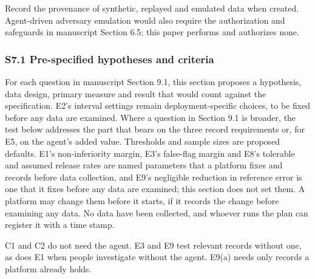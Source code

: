 \documentclass[
  11pt,
]{article}
\begin{document}
Record the provenance of synthetic, replayed and emulated data when
created. Agent-driven adversary emulation would also require the
authorization and safeguards in manuscript Section 6.5; this paper
performs and authorizes none.

\hypertarget{s7.1-pre-specified-hypotheses-and-criteria}{%
\subsubsection{S7.1 Pre-specified hypotheses and
criteria}\label{s7.1-pre-specified-hypotheses-and-criteria}}

For each question in manuscript Section 9.1, this section proposes a
hypothesis, data design, primary measure and result that would count
against the specification. E2's interval settings remain
deployment-specific choices, to be fixed before any data are examined.
Where a question in Section 9.1 is broader, the test below addresses the
part that bears on the three record requirements or, for E5, on the
agent's added value. Thresholds and sample sizes are proposed defaults.
E1's non-inferiority margin, E3's false-flag margin and E8's tolerable
and assumed release rates are named parameters that a platform fixes and
records before data collection, and E9's negligible reduction in
reference error is one that it fixes before any data are examined; this
section does not set them. A platform may change them before it starts,
if it records the change before examining any data. No data have been
collected, and whoever runs the plan can register it with a time stamp.

C1 and C2 do not need the agent. E3 and E9 test relevant records without
one, as does E1 when people investigate without the agent. E9(a) needs
only records a platform already holds.
\end{document}
